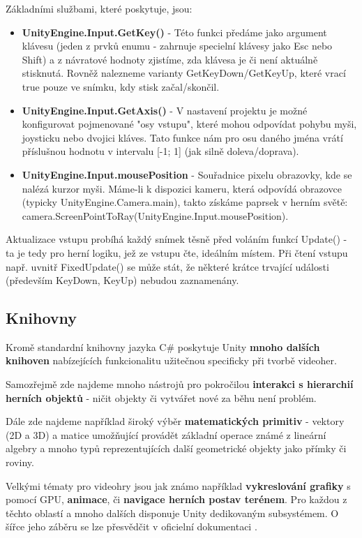 Základními službami, které poskytuje, jsou:
\begin{itemize}
    \item \textbf{UnityEngine.Input.GetKey()} - Této funkci předáme jako argument klávesu (jeden z prvků enumu - zahrnuje specielní klávesy jako Esc nebo Shift) a z návratové hodnoty zjistíme, zda klávesa je či není aktuálně stisknutá. Rovněž nalezneme varianty GetKeyDown/GetKeyUp, které vrací true pouze ve snímku, kdy stisk začal/skončil.
    \item \textbf{UnityEngine.Input.GetAxis()} - V nastavení projektu je možné konfigurovat pojmenované "osy vstupu", které mohou odpovídat pohybu myši, joysticku nebo dvojici kláves. Tato funkce nám pro osu daného jména vrátí příslušnou hodnotu v intervalu [-1; 1] (jak silně doleva/doprava).
    \item \textbf{UnityEngine.Input.mousePosition} - Souřadnice pixelu obrazovky, kde se nalézá kurzor myši. Máme-li k dispozici kameru, která odpovídá obrazovce (typicky UnityEngine.Camera.main), takto získáme paprsek v herním světě: camera.ScreenPointToRay(UnityEngine.Input.mousePosition).  
\end{itemize}

Aktualizace vstupu probíhá každý snímek těsně před voláním funkcí Update() - ta je tedy pro herní logiku, jež ze vstupu čte, ideálním místem. Při čtení vstupu např. uvnitř FixedUpdate() se může stát, že některé krátce trvající události (především KeyDown, KeyUp) nebudou zaznamenány.

\subsection{Knihovny}

Kromě standardní knihovny jazyka C\# poskytuje Unity \textbf{mnoho dalších knihoven} nabízejících funkcionalitu užitečnou specificky při tvorbě videoher.

Samozřejmě zde najdeme mnoho nástrojů pro pokročilou \textbf{interakci s hierarchií herních objektů} - ničit objekty či vytvářet nové za běhu není problém. 

Dále zde najdeme například široký výběr \textbf{matematických primitiv} - vektory (2D a 3D) a matice umožňující provádět základní operace známé z lineární algebry a mnoho typů reprezentujících další geometrické objekty jako přímky či roviny.

Velkými tématy pro videohry jsou jak známo například \textbf{vykreslování grafiky} s pomocí GPU, \textbf{animace}, či \textbf{navigace herních postav terénem}. Pro každou z těchto oblastí a mnoho dalších disponuje Unity dedikovaným subsystémem. O šířce jeho záběru se lze přesvědčit v oficielní dokumentaci \cite{Unity}.

